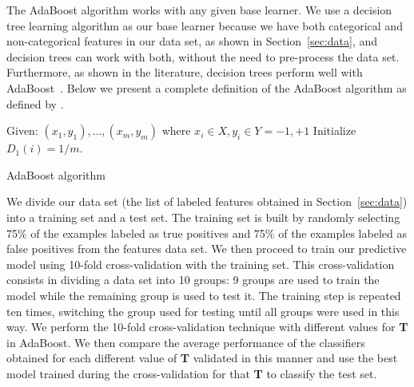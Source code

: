 The AdaBoost algorithm works with any given base learner. We use a decision
tree learning algorithm as our base learner because we have both categorical
and non-categorical features in our data set, as shown in
Section~\ref{sec:data}, and decision trees can work with both, without the need
to pre-process the data set. Furthermore, as shown in the literature, decision
trees perform well with AdaBoost~\citep{drucker1996boosting}. Below we present a
complete definition of the AdaBoost algorithm as defined by
\cite{freund1999short}.

\begin{algorithm}
\begin{algorithmic}
\STATE Given: $(x_1,y_1),\dots,(x_m,y_m)$ where $x_i \in X, y_i \in Y = {-1,+1}$
\STATE Initialize $D_1(i) = 1/m$.
  \ENDFOR
{}
\end{algorithmic}
\label{alg:adaboost}
\caption{AdaBoost algorithm \citep{freund1999short}}
\end{algorithm}

We divide our data set (the list of labeled features obtained in
Section~\ref{sec:data}) into a training set and a test set. The training set is
built by randomly selecting 75\% of the examples labeled as true positives and
75\% of the examples labeled as false positives from the features data set. We
then proceed to train our predictive model using 10-fold cross-validation
with the training set. This cross-validation consists in dividing a data set
into 10 groups: 9 groups are used to train the model while the remaining group is
used to test it. The training step is repeated ten times, switching the group
used for testing until all groups were used in this way.  We perform the
10-fold cross-validation technique with different values for \textbf{T} in
AdaBoost. We then compare the average performance of the classifiers obtained for
each different value of \textbf{T} validated in this manner and use the best
model trained during the cross-validation for that \textbf{T} to classify the
test set.

